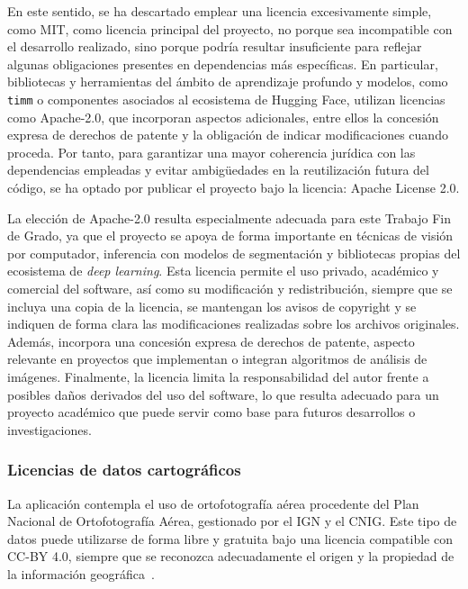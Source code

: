 En este sentido, se ha descartado emplear una licencia excesivamente simple, como MIT, como licencia principal del proyecto, no porque sea incompatible con el desarrollo realizado, sino porque podría resultar insuficiente para reflejar algunas obligaciones presentes en dependencias más específicas. En particular, bibliotecas y herramientas del ámbito de aprendizaje profundo y modelos, como \texttt{timm} o componentes asociados al ecosistema de Hugging Face, utilizan licencias como Apache-2.0, que incorporan aspectos adicionales, entre ellos la concesión expresa de derechos de patente y la obligación de indicar modificaciones cuando proceda. Por tanto, para garantizar una mayor coherencia jurídica con las dependencias empleadas y evitar ambigüedades en la reutilización futura del código, se ha optado por publicar el proyecto bajo la licencia: Apache License 2.0.

La elección de Apache-2.0 resulta especialmente adecuada para este Trabajo Fin de Grado, ya que el proyecto se apoya de forma importante en técnicas de visión por computador, inferencia con modelos de segmentación y bibliotecas propias del ecosistema de \textit{deep learning}. Esta licencia permite el uso privado, académico y comercial del software, así como su modificación y redistribución, siempre que se incluya una copia de la licencia, se mantengan los avisos de copyright y se indiquen de forma clara las modificaciones realizadas sobre los archivos originales. Además, incorpora una concesión expresa de derechos de patente, aspecto relevante en proyectos que implementan o integran algoritmos de análisis de imágenes. Finalmente, la licencia limita la responsabilidad del autor frente a posibles daños derivados del uso del software, lo que resulta adecuado para un proyecto académico que puede servir como base para futuros desarrollos o investigaciones.

\subsubsection{Licencias de datos cartográficos}

La aplicación contempla el uso de ortofotografía aérea procedente del Plan Nacional de Ortofotografía Aérea, gestionado por el IGN y el CNIG. Este tipo de datos puede utilizarse de forma libre y gratuita bajo una licencia compatible con CC-BY 4.0, siempre que se reconozca adecuadamente el origen y la propiedad de la información geográfica~\cite{cnig_pnoa_maxima_actualidad,pnoa_ign}.

